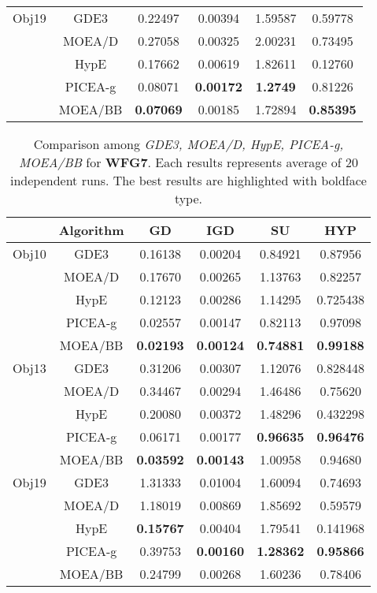 \begin{center}
\begin{table}[!h]
\begin{tabular}{| c | c | c | c | c | c |}
Obj19	&GDE3		&0.22497			&0.00394			&1.59587			&0.59778\\\cline{2-6}
		&MOEA/D		&0.27058			&0.00325			&2.00231			&0.73495\\\cline{2-6}
		&HypE		&0.17662			&0.00619			&1.82611			&0.12760\\\cline{2-6}
		&PICEA-g	&0.08071			&\textbf{0.00172}	&\textbf{1.2749}	&0.81226\\\cline{2-6}
		&MOEA/BB	&\textbf{0.07069}	&0.00185			&1.72894			&\textbf{0.85395}\\
\hline
\end{tabular}

\label{tab:wfg6}

\end{table}
\begin{table}[!h]
\caption{Comparison among \textit{GDE3, MOEA/D, HypE, PICEA-g, MOEA/BB} for \textbf{WFG7}. Each results represents average of 20 independent runs. The best results are highlighted with boldface type.}
\begin{tabular}{| c | c | c | c | c | c |}

\hline
&\textbf{Algorithm}	&\textbf{GD}&\textbf{IGD}&\textbf{SU}&\textbf{HYP}\\\hline
Obj10	&GDE3		&0.16138			&0.00204			&0.84921			&0.87956\\\cline{2-6}
		&MOEA/D		&0.17670			&0.00265			&1.13763			&0.82257\\\cline{2-6}
		&HypE		&0.12123			&0.00286			&1.14295			&0.725438\\\cline{2-6}
		&PICEA-g	&0.02557			&0.00147			&0.82113			&0.97098\\\cline{2-6}
		&MOEA/BB	&\textbf{0.02193}	&\textbf{0.00124}	&\textbf{0.74881}	&\textbf{0.99188}\\\hline
		
Obj13	&GDE3		&0.31206			&0.00307			&1.12076			&0.828448\\\cline{2-6}
		&MOEA/D		&0.34467			&0.00294			&1.46486			&0.75620\\\cline{2-6}
		&HypE		&0.20080			&0.00372			&1.48296			&0.432298\\\cline{2-6}
		&PICEA-g	&0.06171			&0.00177			&\textbf{0.96635}	&\textbf{0.96476}\\\cline{2-6}
		&MOEA/BB	&\textbf{0.03592}	&\textbf{0.00143}	&1.00958			&0.94680\\\hline					
		
Obj19	&GDE3		&1.31333			&0.01004			&1.60094			&0.74693\\\cline{2-6}
		&MOEA/D		&1.18019			&0.00869			&1.85692			&0.59579\\\cline{2-6}
		&HypE		&\textbf{0.15767}	&0.00404			&1.79541			&0.141968\\\cline{2-6}
		&PICEA-g	&0.39753			&\textbf{0.00160}	&\textbf{1.28362}	&\textbf{0.95866}\\\cline{2-6}
		&MOEA/BB	&0.24799			&0.00268			&1.60236			&0.78406\\
\hline
\end{tabular}


\end{table}
\end{center}
